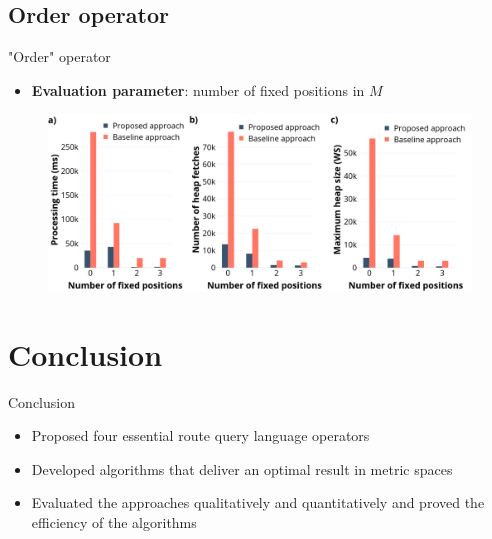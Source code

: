 \documentclass[18pt]{beamer}
\begin{document}
	\subsection{Order operator}
		\begin{frame}{"Order" operator}
		
			\begin{itemize}
				\item \textbf{Evaluation parameter}: number of fixed positions in $M$
			\end{itemize}
			
			\begin{figure}[h]
				\includegraphics[scale=0.275]{order.png}
			\end{figure}
		
		\end{frame}
	
\section{Conclusion}
	\begin{frame}{Conclusion}
	
		\begin{itemize}
			\item Proposed four essential route query language operators 
			\item Developed algorithms that deliver an optimal result in metric spaces
			\item Evaluated the approaches qualitatively and quantitatively and proved the efficiency of the algorithms
			\
		\end{itemize}
	
	\end{frame}
\end{document}
